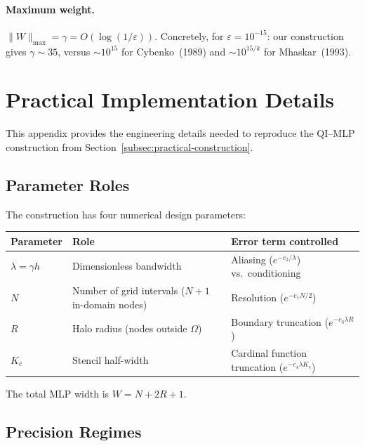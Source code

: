 \documentclass{article}
\begin{document}
\paragraph{Maximum weight.}
\(\|W\|_{\max} = \gamma = O(\log(1/\varepsilon))\).  Concretely, for \(\varepsilon = 10^{-15}\): our construction gives \(\gamma\sim 35\), versus \(\sim 10^{15}\) for Cybenko~(1989) and \(\sim 10^{15/k}\) for Mhaskar~(1993).


\section{Practical Implementation Details}
\label{app:practical-details}

This appendix provides the engineering details needed to reproduce the QI--MLP construction from Section~\ref{subsec:practical-construction}.

\subsection{Parameter Roles}
\label{app:parameter-roles}

The construction has four numerical design parameters:

\begin{center}
\small
\begin{tabular}{@{}lll@{}}
\toprule
Parameter & Role & Error term controlled \\
\midrule
\(\lambda = \gamma h\) & Dimensionless bandwidth & Aliasing (\(e^{-c_2/\lambda}\)) vs.\ conditioning \\
\(N\) & Number of grid intervals (\(N{+}1\) in-domain nodes) & Resolution (\(e^{-c_1 N/2}\)) \\
\(R\) & Halo radius (nodes outside \(\Omega\)) & Boundary truncation (\(e^{-c_3\lambda R}\)) \\
\(K_c\) & Stencil half-width & Cardinal function truncation (\(e^{-c_4\lambda K_c}\)) \\
\bottomrule
\end{tabular}
\end{center}

The total MLP width is \(W = N + 2R + 1\).

\subsection{Precision Regimes}
\label{app:precision-regimes}
\end{document}
